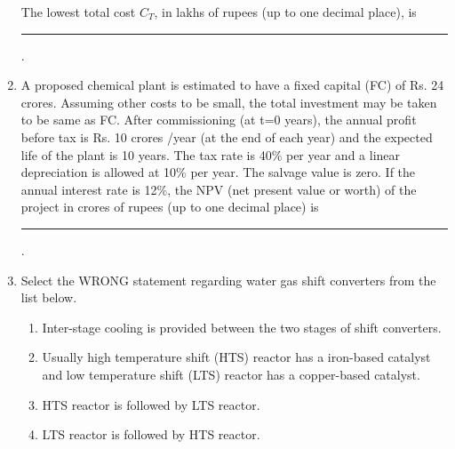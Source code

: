 \documentclass[journal,12pt,onecolumn]{IEEEtran}
\theoremstyle{remark}
\begin{document}
\begin{enumerate}
The lowest total cost $C_T$, in lakhs of rupees (up to one decimal place), is\rule{40pt}{0.1mm}.

\hfill{}
    \item A proposed chemical plant is estimated to have a fixed capital (FC) of Rs. 24 crores. Assuming other costs to be small, the total investment may be taken to be same as FC. After commissioning (at t=0 years), the annual profit before tax is Rs. 10 crores /year (at the end of each year) and the expected life of the plant is 10 years. The tax rate is 40\% per year and a linear depreciation is allowed at 10\% per year. The salvage value is zero. If the annual interest rate is 12\%, the NPV (net present value or worth) of the project in crores of rupees (up to one decimal place) is\rule{40pt}{0.1mm}.

\hfill{}
    \item Select the WRONG statement regarding water gas shift converters from the list below.

\hfill{}
\begin{enumerate}
    \item Inter-stage cooling is provided between the two stages of shift converters. 
    \item Usually high temperature shift (HTS) reactor has a iron-based catalyst and low temperature shift (LTS) reactor has a copper-based catalyst.

    \item HTS reactor is followed by LTS reactor.

    \item LTS reactor is followed by HTS reactor.
\end{enumerate}
\end{enumerate}
\end{document}
